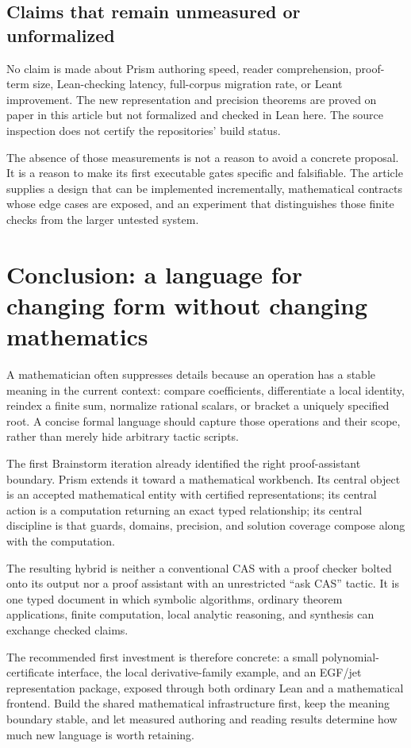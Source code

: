 \documentclass[11pt,a4paper]{article}
\theoremstyle{definition}
\theoremstyle{remark}
\begin{document}
\subsection{Claims that remain unmeasured or unformalized}
No claim is made about Prism authoring speed, reader comprehension, proof-term size, Lean-checking latency, full-corpus migration rate, or Leant improvement. The new representation and precision theorems are proved on paper in this article but not formalized and checked in Lean here. The source inspection does not certify the repositories' build status.

The absence of those measurements is not a reason to avoid a concrete proposal. It is a reason to make its first executable gates specific and falsifiable. The article supplies a design that can be implemented incrementally, mathematical contracts whose edge cases are exposed, and an experiment that distinguishes those finite checks from the larger untested system.

\section{Conclusion: a language for changing form without changing mathematics}
A mathematician often suppresses details because an operation has a stable meaning in the current context: compare coefficients, differentiate a local identity, reindex a finite sum, normalize rational scalars, or bracket a uniquely specified root. A concise formal language should capture those operations and their scope, rather than merely hide arbitrary tactic scripts.

The first Brainstorm iteration already identified the right proof-assistant boundary. Prism extends it toward a mathematical workbench. Its central object is an accepted mathematical entity with certified representations; its central action is a computation returning an exact typed relationship; its central discipline is that guards, domains, precision, and solution coverage compose along with the computation.

The resulting hybrid is neither a conventional CAS with a proof checker bolted onto its output nor a proof assistant with an unrestricted ``ask CAS'' tactic. It is one typed document in which symbolic algorithms, ordinary theorem applications, finite computation, local analytic reasoning, and synthesis can exchange checked claims.

The recommended first investment is therefore concrete: a small polynomial-certificate interface, the local derivative-family example, and an EGF/jet representation package, exposed through both ordinary Lean and a mathematical frontend. Build the shared mathematical infrastructure first, keep the meaning boundary stable, and let measured authoring and reading results determine how much new language is worth retaining.
\end{document}

